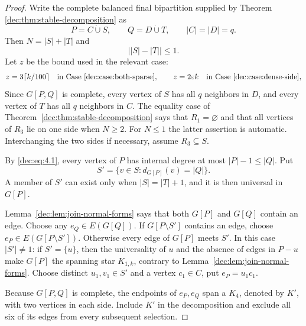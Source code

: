 \documentclass[11pt]{article}
\numberwithin{equation}{section}
\theoremstyle{remark}
\newcommand{\e}{\varepsilon}
\newcommand{\dotcupunion}{\mathbin{\dot\cup}}
\begin{document}
\begin{proof}
Write the complete balanced final bipartition supplied by Theorem
\ref{dec:thm:stable-decomposition} as
\begin{equation*}
 P=C\dotcupunion S,\qquad Q=D\dotcupunion T,\qquad |C|=|D|=q.
\end{equation*}
Then \(N=|S|+|T|\) and
\begin{equation}\label{dec:eq:4.1}
 \bigl||S|-|T|\bigr|\le1.
\end{equation}
Let \(z\) be the bound used in the relevant case:
\begin{equation*}
 z=3\lceil k/100\rceil
\quad\text{in Case~\ref{dec:case:both-sparse}},\qquad
 z=2\e k
\quad\text{in Case~\ref{dec:case:dense-side}},
\end{equation*}
Since \(G[P,Q]\) is complete, every
vertex of \(S\) has all \(q\) neighbors in \(D\), and every vertex of
\(T\) has all \(q\) neighbors in \(C\). The equality
case of Theorem~\ref{dec:thm:stable-decomposition} says that
\(R_1=\varnothing\) and that all vertices of \(R_3\)
lie on one side when \(N\ge2\).  For \(N\le1\) the latter assertion is automatic.  Interchanging
the two sides if necessary, assume \(R_3\subseteq S\).

By \eqref{dec:eq:4.1}, every vertex of \(P\) has internal degree at most
\(|P|-1\le|Q|\). Put
\begin{equation*}
 S'=\{v\in S:d_{G[P]}(v)=|Q|\}.
\end{equation*}
A member of \(S'\) can exist only when \(|S|=|T|+1\), and it is then universal in \(G[P]\).

Lemma~\ref{dec:lem:join-normal-forms} says that both \(G[P]\) and \(G[Q]\)
contain an edge.  Choose any \(e_Q\in E(G[Q])\).  If \(G[P\setminus S']\)
contains an edge, choose \(e_P\in E(G[P\setminus S'])\).  Otherwise every
edge of \(G[P]\) meets \(S'\).  In this case
\(|S'|\ne1\): if \(S'=\{u\}\), then the universality of
\(u\) and the absence of edges in \(P-u\) make \(G[P]\) the spanning star \(K_{1,k}\),
contrary to Lemma~\ref{dec:lem:join-normal-forms}.  Choose distinct
\(u_1,v_1\in S'\) and a vertex \(c_1\in C\), put \(e_P=u_1c_1\).

Because \(G[P,Q]\) is complete, the endpoints of \(e_P,e_Q\) span a
\(K_4\), denoted by \(K'\), with two vertices in each side.  Include
\(K'\) in the decomposition and exclude all six of its edges from every subsequent selection.


\end{proof}
\end{document}

